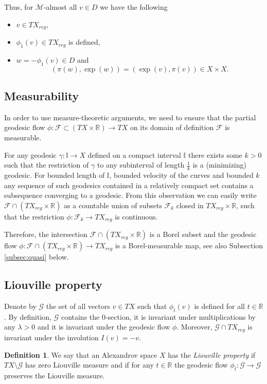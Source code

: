\documentclass[12pt,leqno,intlimits]{amsart}
\numberwithin{equation}{section}
\theoremstyle{definition}
\newtheorem{defn}[thm]{Definition}%
\theoremstyle{remark}
\newcommand{\R}{\mathbb{R}}
\def\:{\colon}
\begin{document}
Thus,  for $\mathcal M$-almost all $v\in D$ we have the following
\begin{itemize}
\item $v\in TX_{reg}$,
\item $\phi _1(v) \in TX_{reg}$ is defined,
\item $w=-\phi_1 (v)\in D$ and
 \begin{equation} \label{eq:symm}
(\pi (w), \exp (w))=(\exp (v), \pi (v)) \in X\times X.
 \end{equation}
\end{itemize}


\subsection{Measurability} \label{subsec:measur}
In order to use measure-theoretic arguments, we need to ensure that the partial geodesic flow $\phi\:\mathcal F\subset (TX\times \R) \to TX$ on its domain of definition $\mathcal F$
is measurable.

For any  geodesic $\gamma \:\mathbb I\to X$ defined on a compact interval $\mathbb I$ there exists some $k>0$ such that  the restriction of $\gamma$ to any subinterval of length $\frac 1 k$ is
a (minimizing) geodesic. For bounded length of $\mathbb I$, bounded velocity of the curves and bounded $k$ any sequence of such  geodesics contained in a relatively compact set
contains a subsequence converging to a  geodesic. From this observation we can easily write  $\mathcal F\cap (TX_{reg} \times \R)$ as a countable union of subsets $\mathcal F_k$ closed in
$TX_{reg} \times \R$, such that the restriction $\phi\: \mathcal F_k \to TX_{reg}$ is continuous.

Therefore,  the intersection $\mathcal F\cap (TX_{reg} \times \R )$ is a Borel subset  and the geodesic flow
$\phi \:\mathcal F\cap (TX_{reg} \times \R)  \to TX_{reg}$ is a Borel-measurable map, see also Subsection \ref{subsec:quasi} below.








\subsection{Liouville property}
 Denote by $\mathcal G$ the set of all vectors $v\in TX $ such that $\phi _t(v)$ is defined for all $t\in \R$. By definition, $\mathcal G$ contains the $0$-section, it
 is invariant under multiplications by any $\lambda >0$  and it is invariant under the geodesic flow $\phi$. Moreover, $\mathcal G\cap TX_{reg}$ is invariant under the involution $I (v)=-v$.
  \begin{defn}
 We say that an Alexandrov space $X$ has the \emph{Liouville property} if  $TX\setminus \mathcal G$ has zero Liouville measure  and if
for any $t\in \R$ the geodesic flow $\phi _t \:\mathcal G\to \mathcal G$ preserves the Liouville measure.
 \end{defn}
\end{document}
